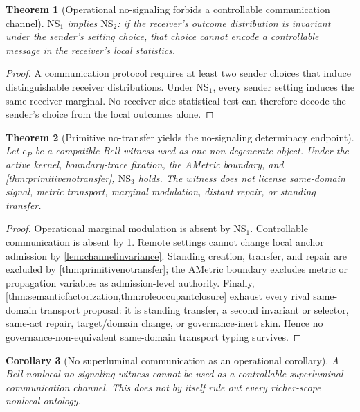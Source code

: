 \documentclass[11pt]{article}
\newtheorem{theorem}{Theorem}[section]
\newtheorem{corollary}[theorem]{Corollary}
\theoremstyle{definition}
\newcommand{\NSone}{\mathrm{NS}_{1}}
\newcommand{\NStwo}{\mathrm{NS}_{2}}
\newcommand{\NSthree}{\mathrm{NS}_{3}}
\begin{document}
\begin{theorem}[Operational no-signaling forbids a controllable communication channel]\label{thm:ns1ns2}
$\NSone$ implies $\NStwo$: if the receiver's outcome distribution is invariant under the sender's setting choice, that choice cannot encode a controllable message in the receiver's local statistics.
\end{theorem}

\begin{proof}
A communication protocol requires at least two sender choices that induce distinguishable receiver distributions. Under $\NSone$, every sender setting induces the same receiver marginal. No receiver-side statistical test can therefore decode the sender's choice from the local outcomes alone.
\end{proof}

\begin{theorem}[Primitive no-transfer yields the no-signaling determinacy endpoint]\label{thm:compatnosig}
Let $e_P$ be a compatible Bell witness used as one non-degenerate object. Under the active kernel, boundary-trace fixation, the AMetric boundary, and \cref{thm:primitivenotransfer}, $\NSthree$ holds. The witness does not license same-domain signal, metric transport, marginal modulation, distant repair, or standing transfer.
\end{theorem}

\begin{proof}
Operational marginal modulation is absent by $\NSone$. Controllable communication is absent by \cref{thm:ns1ns2}. Remote settings cannot change local anchor admission by \cref{lem:channelinvariance}. Standing creation, transfer, and repair are excluded by \cref{thm:primitivenotransfer}; the AMetric boundary excludes metric or propagation variables as admission-level authority. Finally, \cref{thm:semanticfactorization,thm:roleoccupantclosure} exhaust every rival same-domain transport proposal: it is standing transfer, a second invariant or selector, same-act repair, target/domain change, or governance-inert skin. Hence no governance-non-equivalent same-domain transport typing survives.
\end{proof}

\begin{corollary}[No superluminal communication as an operational corollary]
A Bell-nonlocal no-signaling witness cannot be used as a controllable superluminal communication channel. This does not by itself rule out every richer-scope nonlocal ontology.
\end{corollary}
\end{document}
